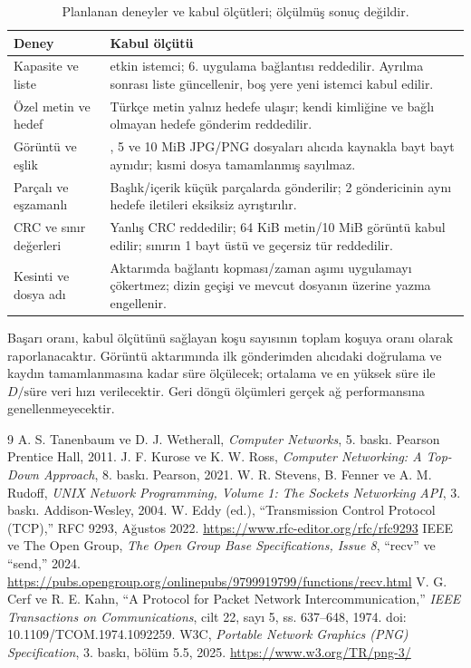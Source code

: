 \documentclass[12pt,oneside,a4paper]{article}
\begin{document}
\begin{table}[H]
\centering
\caption{Planlanan deneyler ve kabul ölçütleri; ölçülmüş sonuç değildir.}
\label{tab:validation}
\footnotesize\renewcommand{\arraystretch}{1.06}
\begin{tabularx}{\linewidth}{@{}>{\raggedright\arraybackslash}p{3.15cm}>{\raggedright\arraybackslash}X@{}}
\toprule
\textbf{Deney} & \textbf{Kabul ölçütü}\\
\midrule
Kapasite ve liste & 5 etkin istemci; 6. uygulama bağlantısı reddedilir.
Ayrılma sonrası liste güncellenir, boş yere yeni istemci kabul edilir.\\
Özel metin ve hedef & Türkçe metin yalnız hedefe ulaşır; kendi kimliğine
ve bağlı olmayan hedefe gönderim reddedilir.\\
Görüntü ve eşlik & 1, 5 ve 10 MiB JPG/PNG dosyaları alıcıda
kaynakla bayt bayt aynıdır; kısmi dosya tamamlanmış sayılmaz.\\
Parçalı ve eşzamanlı & Başlık/içerik küçük parçalarda gönderilir;
2 göndericinin aynı hedefe iletileri eksiksiz ayrıştırılır.\\
CRC ve sınır değerleri & Yanlış CRC reddedilir; 64 KiB metin/10 MiB
görüntü kabul edilir; sınırın 1 bayt üstü ve geçersiz tür reddedilir.\\
Kesinti ve dosya adı & Aktarımda bağlantı kopması/zaman aşımı uygulamayı
çökertmez; dizin geçişi ve mevcut dosyanın üzerine yazma engellenir.\\
\bottomrule
\end{tabularx}
\end{table}

Başarı oranı, kabul ölçütünü sağlayan koşu sayısının toplam koşuya
oranı olarak raporlanacaktır. Görüntü aktarımında ilk gönderimden
alıcıdaki doğrulama ve kaydın tamamlanmasına kadar süre ölçülecek;
ortalama ve en yüksek süre ile $D/\text{süre}$ veri hızı verilecektir. Geri döngü
ölçümleri gerçek ağ performansına genellenmeyecektir.

\begingroup\footnotesize
\begin{thebibliography}{9}
\setlength{\itemsep}{2pt}\setlength{\parsep}{0pt}
A. S. Tanenbaum ve D. J. Wetherall, \emph{Computer Networks},
5. baskı. Pearson Prentice Hall, 2011.
J. F. Kurose ve K. W. Ross, \emph{Computer Networking: A Top-Down
Approach}, 8. baskı. Pearson, 2021.
W. R. Stevens, B. Fenner ve A. M. Rudoff, \emph{UNIX Network
Programming, Volume 1: The Sockets Networking API}, 3. baskı.
Addison-Wesley, 2004.
W. Eddy (ed.), ``Transmission Control Protocol (TCP),'' RFC 9293,
Ağustos 2022. \url{https://www.rfc-editor.org/rfc/rfc9293}
IEEE ve The Open Group, \emph{The Open Group Base Specifications,
Issue 8}, ``recv'' ve ``send,'' 2024.
\url{https://pubs.opengroup.org/onlinepubs/9799919799/functions/recv.html}
V. G. Cerf ve R. E. Kahn, ``A Protocol for Packet Network
Intercommunication,'' \emph{IEEE Transactions on Communications},
cilt 22, sayı 5, ss. 637--648, 1974. doi: 10.1109/TCOM.1974.1092259.
W3C, \emph{Portable Network Graphics (PNG) Specification},
3. baskı, bölüm 5.5, 2025. \url{https://www.w3.org/TR/png-3/}
\end{thebibliography}
\endgroup
\end{document}
